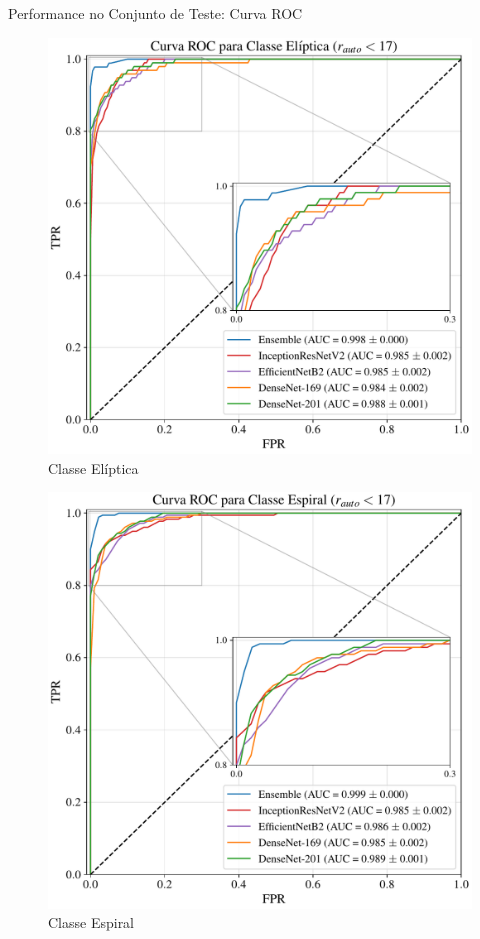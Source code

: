 \documentclass[10pt,xcolor=svgnames]{beamer}
\begin{document}
\begin{frame}{Performance no Conjunto de Teste: Curva ROC}
  \begin{minipage}{0.48\textwidth}
    \begin{figure}
      \includegraphics[width=\linewidth]{figures/roc_mn170_E.pdf}
      \caption{Classe Elíptica}
    \end{figure}
  \end{minipage}\hfill
  \begin{minipage}{0.48\textwidth}
    \begin{figure}
      \includegraphics[width=\linewidth]{figures/roc_mn170_S.pdf}
      \caption{Classe Espiral}
    \end{figure}
  \end{minipage}
\end{frame}
\end{document}
